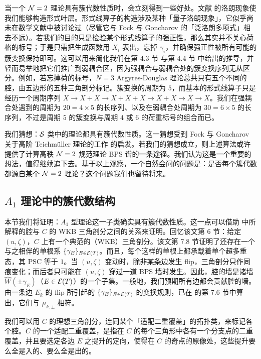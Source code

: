 当一个 $\mathcal{N}=2$ 理论具有簇代数性质时，会立刻得到一些好处。文献 \cite{MR1888840} 的洛朗现象使我们能够构造形式叶层。形式线算子的构造涉及某种「量子洛朗现象」，它似乎尚未在数学文献中被讨论过（尽管它与 Fock 与 Goncharov 的「泛洛朗多项式」相去不远）。若我们的目的只是检验某个形式线算子的强正性，那么其实并不关心荷格的标号；于是只需把生成函数用 $X_i$ 表出，忘掉 $\gamma_i$，并确保强正性被所有可能的簇变换保持即可。这可以用来简化我们在第 4.3 节%
与第 4.4 节%
中给出的推导，并轻而易举地把它们推广到弱耦合区，因为强耦合与弱耦合处的簇变换序列无从区分。例如，若忘掉荷的标号，$N=3$ Argyres-Douglas 理论总共只有五个不同的腔，由五边形的五种三角剖分标记。簇变换的周期为 $5$，而基本的形式线算子只是经历一个周期序列 $X\to X+X \to X+X+X \to X+X \to X \to X$。我们在强耦合处遇到的周期为 $20=4 \times 5$ 的长序列、以及在弱耦合处周期为 $30 = 6 \times 5$ 的长序列，不过是周期 $5$ 的簇变换与周期 $4$ 或 $6$ 的荷重标号的组合而已。

我们猜想：$\mathcal{S}$ 类中的理论都具有簇代数性质。这一猜想受到 Fock 与 Goncharov 关于高阶 Teichm\"uller 理论的工作 \cite{MR2233852} 的启发。若我们的猜想成立，则上述算法或许提供了计算高秩 $\mathcal{N}=2$ 规范理论 BPS 谱的一条途径。我们认为这是一个重要的想法，值得继续追下去。基于以上观察，一个自然会问的问题是：是否每个簇代数都源自某个 $\mathcal{N}=2$ 理论？这个问题我们也留待将来。

\subsection{$A_1$ 理论中的簇代数结构}
\label{subsec:Seeds-from-A1}

本节我们将证明：$A_1$ 型理论这一子类确实具有簇代数性质。这一点可以借助 \cite{Gaiotto:2009hg} 中所解释的腔与 $C$ 的 WKB 三角剖分之间的关系来证明。回忆该文第 6 节：给定 $(u,\zeta)$，$C$ 上有一个典范的（WKB）三角剖分。该文第 7.8 节证明了还存在一个与之相伴的单根系 $\{ \gamma_E \}_{E\in \mathcal{E}(T)}$。而且，每个这样的单根上都承载着单个超多重态，其 PSC 等于 $1$。当 $(u,\zeta)$ 变动时，除非某条边发生 flip，三角剖分只作同痕变化；而后者只可能在 $(u,\zeta)$ 穿过一道 BPS 墙时发生。因此，腔的墙是诸墙 $\widehat{W}(\pm \gamma_E)$（$E\in \mathcal{E}(T)$）的一个子集。一般地，我们预期所有边都会贡献腔的墙。由一条边 $E_k$ 的 flip 所引起的 $\{ \gamma_E \}_{E\in \mathcal{E}(T)}$ 的变换规则，已在 \cite{Gaiotto:2009hg} 的第 7.6 节中算出，它们与 $\mu_{k,\pm}$ 相符。

我们可以用 $C$ 的理想三角剖分，连同某个「适配二重覆盖」的拓扑类，来标记各个腔。$C$ 的一个适配二重覆盖，是指在 $C$ 的每个三角形中各有一个分支点的二重覆盖，并且要选定各边 $E$ 之提升的定向，使得在 $C$ 的奇点的原像处，这些提升要么全是入的、要么全是出的。

